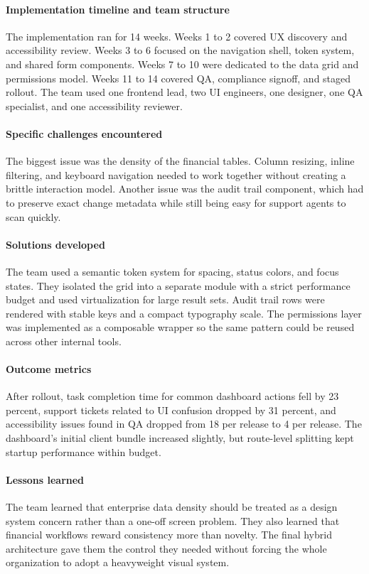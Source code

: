 \paragraph{Implementation timeline and team structure}
The implementation ran for 14 weeks. Weeks 1 to 2 covered UX discovery and accessibility review. Weeks 3 to 6 focused on the navigation shell, token system, and shared form components. Weeks 7 to 10 were dedicated to the data grid and permissions model. Weeks 11 to 14 covered QA, compliance signoff, and staged rollout. The team used one frontend lead, two UI engineers, one designer, one QA specialist, and one accessibility reviewer.

\paragraph{Specific challenges encountered}
The biggest issue was the density of the financial tables. Column resizing, inline filtering, and keyboard navigation needed to work together without creating a brittle interaction model. Another issue was the audit trail component, which had to preserve exact change metadata while still being easy for support agents to scan quickly.

\paragraph{Solutions developed}
The team used a semantic token system for spacing, status colors, and focus states. They isolated the grid into a separate module with a strict performance budget and used virtualization for large result sets. Audit trail rows were rendered with stable keys and a compact typography scale. The permissions layer was implemented as a composable wrapper so the same pattern could be reused across other internal tools.

\paragraph{Outcome metrics}
After rollout, task completion time for common dashboard actions fell by 23 percent, support tickets related to UI confusion dropped by 31 percent, and accessibility issues found in QA dropped from 18 per release to 4 per release. The dashboard's initial client bundle increased slightly, but route-level splitting kept startup performance within budget.

\paragraph{Lessons learned}
The team learned that enterprise data density should be treated as a design system concern rather than a one-off screen problem. They also learned that financial workflows reward consistency more than novelty. The final hybrid architecture gave them the control they needed without forcing the whole organization to adopt a heavyweight visual system.

